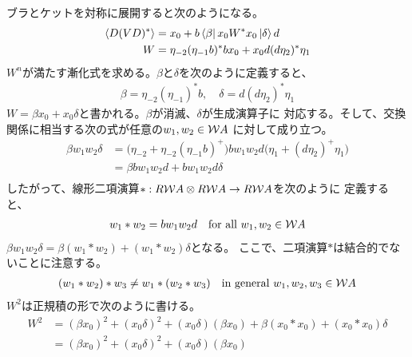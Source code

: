 {	ブラとケットを対称に展開すると次のようになる。
	\begin{equation*}\begin{split}
		\mathinner{\langle{D(VD)^*}\rangle} &= x_0 + b\mathinner{\langle{\beta}|}x_0W^*x_0\mathinner{|{\delta}\rangle}d \\
		W &= \eta_{-2}(\eta_{-1}b)^*bx_0 + x_0d(d\eta_2)^*\eta_1 \\
	\end{split}\end{equation*}
	$W^n$が満たす漸化式を求める。$\beta$と$\delta$を次のように定義すると、
	\begin{equation*}\begin{split}
		\beta = \eta_{-2}(\eta_{-1})^*b,\quad \delta = d(d\eta_2)^*\eta_1
	\end{split}\end{equation*}
	$W=\beta x_0+x_0\delta$と書かれる。$\beta$が消滅、$\delta$が生成演算子に
	対応する。そして、交換関係に相当する次の式が任意の$w_1,w_2\in{\ensuremath{{\mathcal{W}}}} A$
	に対して成り立つ。
	\begin{equation*}\begin{split}
		\beta w_1 w_2 \delta 
		&= \bigl(\eta_{-2} + \eta_{-2}(\eta_{-1}b)^+\bigr) bw_1w_2d
		\bigl(\eta_{1} + (d\eta_{2})^+\eta_{1}\bigr) \\
		&= \beta bw_1w_2d + bw_1w_2d \delta \\
	\end{split}\end{equation*}
	したがって、線形二項演算$*:R{{\mathcal{W}}} A\otimes R{{\mathcal{W}}} A\to R{{\mathcal{W}}} A$を次のように
	定義すると、
	\begin{equation*}\begin{split}
		w_1*w_2 = bw_1w_2d \quad\text{for all } w_1,w_2\in {\ensuremath{{\mathcal{W}}}} A
	\end{split}\end{equation*}
	$\beta w_1 w_2\delta=\beta(w_1*w_2)+(w_1*w_2)\delta$となる。
	ここで、二項演算$*$は結合的でないことに注意する。
	\begin{equation*}\begin{split}
		(w_1*w_2)*w_3 \neq w_1*(w_2*w_3)
		\quad\text{in general } w_1,w_2,w_3\in {\ensuremath{{\mathcal{W}}}} A
	\end{split}\end{equation*}
	$W^2$は正規積の形で次のように書ける。
	\begin{equation*}\begin{split}
		W^2 &= (\beta x_0)^2 + (x_0\delta)^2 + (x_0\delta)(\beta x_0)
			+ \beta (x_0 * x_0) + (x_0 * x_0) \delta \\
		&= (\beta x_0)^2 + (x_0\delta)^2 + (x_0\delta)(\beta x_0)

\end{split}
\end{equation*}}
